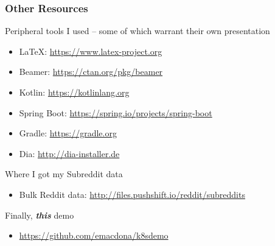     \begin{frame}
        \frametitle{Other Resources}
        Peripheral tools I used -- some of which warrant their own presentation
        \begin{itemize}
            \item \LaTeX: \href{https://www.latex-project.org}{https://www.latex-project.org}
            \item Beamer: \href{https://ctan.org/pkg/beamer}{https://ctan.org/pkg/beamer}
            \item Kotlin: \href{https://kotlinlang.org}{https://kotlinlang.org}
            \item Spring Boot: \href{https://spring.io/projects/spring-boot}{https://spring.io/projects/spring-boot}
            \item Gradle: \href{https://gradle.org}{https://gradle.org}
            \item Dia: \href{http://dia-installer.de}{http://dia-installer.de}
        \end{itemize}
        \smallskip
        Where I got my Subreddit data
        \begin{itemize}
            \item Bulk Reddit data: \href{http://files.pushshift.io/reddit/subreddits}{http://files.pushshift.io/reddit/subreddits}
        \end{itemize}
        Finally, \textbf{\textit{this}} demo
        \begin{itemize}
            \item \href{https://github.com/emacdona/k8sdemo}{https://github.com/emacdona/k8sdemo}
        \end{itemize}
    \end{frame}

